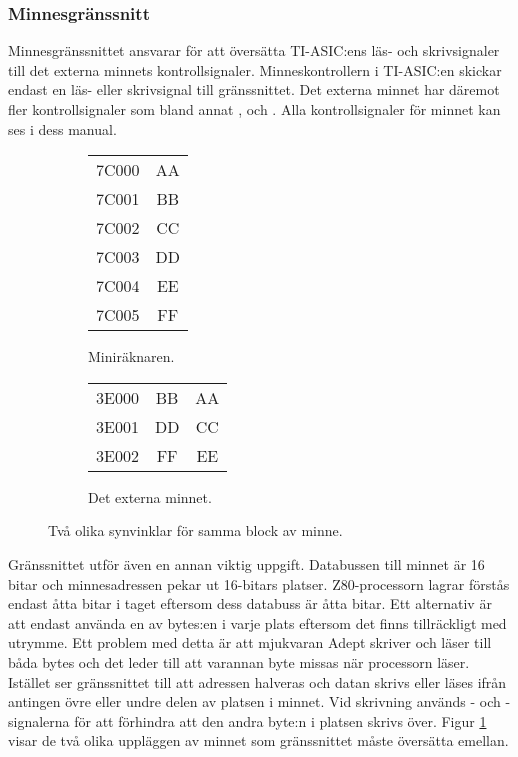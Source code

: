 \documentclass[main.tex]{subfiles}
\begin{document}
\subsubsection{Minnesgränssnitt}
Minnesgränssnittet ansvarar för att översätta TI-ASIC:ens läs- och
skrivsignaler till det externa minnets kontrollsignaler. Minneskontrollern i
TI-ASIC:en skickar endast en läs- eller skrivsignal till gränssnittet. Det
externa minnet har däremot fler kontrollsignaler som bland annat
,  och . Alla
kontrollsignaler för minnet kan ses i dess manual.\cite{m45}

\begin{figure}
    \begin{subfigure}{0.5\textwidth}
        \centering
        \ttfamily
        \begin{tabular}{r|c|}
            \cline{2-2}
            7C000 & AA \\ \cline{2-2}
            7C001 & BB \\ \cline{2-2}
            7C002 & CC \\ \cline{2-2}
            7C003 & DD \\ \cline{2-2}
            7C004 & EE \\ \cline{2-2}
            7C005 & FF \\ \cline{2-2}
        \end{tabular}
        \caption{Miniräknaren.}
    \end{subfigure}
    \begin{subfigure}{0.5\textwidth}
        \centering
        \ttfamily
        \begin{tabular}{r|c|c|}
            \cline{2-3}
            3E000 & BB & AA \\ \cline{2-3}
            3E001 & DD & CC \\ \cline{2-3}
            3E002 & FF & EE \\ \cline{2-3}
        \end{tabular}
        \caption{Det externa minnet.}
    \end{subfigure}
    \caption{Två olika synvinklar för samma block av minne.}
    \label{fig:mif}
\end{figure}

Gränssnittet utför även en annan viktig uppgift. Databussen till minnet är 16
bitar och minnesadressen pekar ut 16-bitars platser. Z80-processorn lagrar
förstås endast åtta bitar i taget eftersom dess databuss är åtta bitar. Ett
alternativ är att endast använda en av bytes:en i varje plats eftersom det
finns tillräckligt med utrymme. Ett problem med detta är att mjukvaran Adept
skriver och läser till båda bytes och det leder till att varannan byte missas
när processorn läser. Istället ser gränssnittet till att adressen halveras och
datan skrivs eller läses ifrån antingen övre eller undre delen av platsen i
minnet. Vid skrivning används - och
-signalerna för att förhindra att den andra byte:n i platsen
skrivs över. Figur \ref{fig:mif} visar de två olika uppläggen av minnet som
gränssnittet måste översätta emellan.
\end{document}
